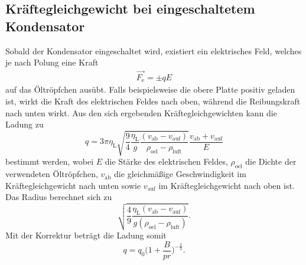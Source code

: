 \subsection{Kräftegleichgewicht bei eingeschaltetem Kondensator}
Sobald der Kondensator eingeschaltet wird, existiert ein elektrisches Feld, welches je nach Polung eine Kraft
\begin{align*}
  \vec{F_\text{e}} = \pm qE
\end{align*}
auf das Öltröpfchen ausübt.
Falls beispielsweise die obere Platte positiv geladen ist, wirkt die Kraft des elektrischen Feldes nach oben, während die Reibungskraft nach unten wirkt.
Aus den sich ergebenden Kräftegleichgewichten kann die Ladung zu
\begin{equation}
  q = 3 \pi \eta_\text{L} \sqrt{ \frac{9}{4} \frac{\eta_\text{L}}{g} \frac{ (v_\text{ab} - v_\text{auf}  )  }{\rho_\text{oel} - \rho_\text{luft}} } \frac{v_\text{ab} + v_\text{auf}}{E}
\end{equation}
bestimmt werden, wobei $E$ die Stärke des elektrischen Feldes, $\rho_\text{oel}$ die Dichte der verwendeten Öltröpfchen, $v_\text{ab}$ die gleichmäßige Geschwindigkeit im Kräftegleichgewicht nach unten  sowie $v_\text{auf}$ im Kräftegleichgewicht nach oben ist.
Das Radius berechnet sich zu
\begin{equation}
  \sqrt{ \frac{4}{9} \frac{ \eta_\text{L} ( v_\text{ab} - v_\text{auf} ) }{g (\rho_\text{oel} - \rho_\text{luft}) }   }.
\end{equation}
Mit der Korrektur beträgt die Ladung somit
\begin{equation}
  q = q_0 \bigl( 1 + \frac{B}{p r}  \bigr)^{-\frac{2}{3}}.
\end{equation}


